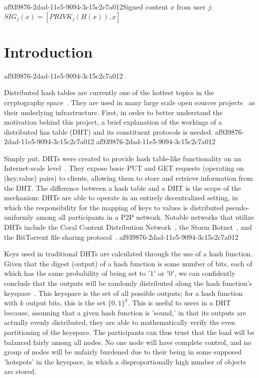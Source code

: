 \documentclass[12pt]{article}
\begin{document}
af939876-2dad-11e5-9094-3c15c2c7a012Signed content $x$ from user $j$: $SIG_j(x) = \left[ PRIVK_j( H(x) ), x \right]$

\section{Introduction}
af939876-2dad-11e5-9094-3c15c2c7a012\par Distributed hash tables are currently one of the hottest topics in the cryptography space~\cite{Stoica:2001dj,Rowstron:2001ea,Ratnasamy:2001wn}. They are used in many large scale open sources projects~\cite{Freitas:2013tb,Xu:2010vs,Perfitt:2010fh} as their underlying infrastructure. First, in order to better understand the motivation behind this project, a brief explanation of the workings of a distributed has table (DHT) and its constituent protocols is needed.
af939876-2dad-11e5-9094-3c15c2c7a012
af939876-2dad-11e5-9094-3c15c2c7a012\par Simply put, DHTs were created to provide hash table-like functionality on an Internet-scale level~\cite{Ratnasamy:2001wn}. They expose basic PUT and GET requests (operating on (key,value) pairs) to clients, allowing them to store and retrieve information from the DHT. The difference between a hash table and a DHT is the scope of the mechanism: DHTs are able to operate in an entirely decentralized setting, in which the responsibility for the mapping of keys to values is distributed pseudo-uniformly among all participants in a P2P network. Notable networks that utilize DHTs include the Coral Content Distribution Network~\cite{Freedman:2004vb}, the Storm Botnet~\cite{Holz:2008uk}, and the BitTorrent file sharing protocol~\cite{Cohen:y1_8mBnw}.
af939876-2dad-11e5-9094-3c15c2c7a012
\par Keys used in traditional DHTs are calculated through the use of a hash function. Given that the digest (output) of a hash function is some number of bits, each of which has the same probability of being set to $'1'$ or $'0'$, we can confidently conclude that the outputs will be randomly distributed along the hash function's keyspace~. This keyspace is the set of all possible outputs; for a hash function with $k$ output bits, this is the set $\{0,1\}^k$. This is useful to users in a DHT because, assuming that a given hash function is 'sound,' in that its outputs are actually evenly distributed, they are able to mathematically verify the even partitioning of the keyspace. The participants can thus trust that the load will be balanced fairly among all nodes. No one node will have complete control, and no group of nodes will be unfairly burdened due to their being in some supposed 'hotspots' in the keyspace, in which a disproportionally high number of objects are stored.~
\end{document}
